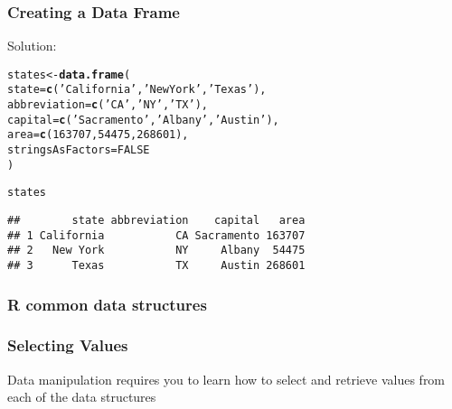 \documentclass[12pt]{beamer}\usepackage[]{graphicx}\usepackage[]{color}
\makeatletter
\newcommand{\hlnum}[1]{\textcolor[rgb]{0.686,0.059,0.569}{#1}}%
\newcommand{\hlstr}[1]{\textcolor[rgb]{0.192,0.494,0.8}{#1}}%
\newcommand{\hlstd}[1]{\textcolor[rgb]{0.345,0.345,0.345}{#1}}%
\newcommand{\hlkwb}[1]{\textcolor[rgb]{0.69,0.353,0.396}{#1}}%
\newcommand{\hlkwc}[1]{\textcolor[rgb]{0.333,0.667,0.333}{#1}}%
\newcommand{\hlkwd}[1]{\textcolor[rgb]{0.737,0.353,0.396}{\textbf{#1}}}%
\newenvironment{kframe}{%
 \def\at@end@of@kframe{}%
 \ifinner\ifhmode%
  \def\at@end@of@kframe{\end{minipage}}%
  \begin{minipage}{\columnwidth}%
 \fi\fi%
 \def\FrameCommand##1{\hskip\@totalleftmargin \hskip-\fboxsep
 \colorbox{shadecolor}{##1}\hskip-\fboxsep
     \hskip-\linewidth \hskip-\@totalleftmargin \hskip\columnwidth}%
 \MakeFramed {\advance\hsize-\width
   \@totalleftmargin\z@ \linewidth\hsize
   \@setminipage}}%
 {\par\unskip\endMakeFramed%
 \at@end@of@kframe}
\newenvironment{knitrout}{}{} %
\makeatother
\begin{document}
\begin{frame}[fragile]
\frametitle{Creating a Data Frame}

Solution:
\begin{knitrout}\footnotesize
{}\color{fgcolor}\begin{kframe}
\begin{alltt}
\hlstd{states} \hlkwb{<-} \hlkwd{data.frame}\hlstd{(}
  \hlkwc{state} \hlstd{=} \hlkwd{c}\hlstd{(}\hlstr{'California'}\hlstd{,} \hlstr{'New York'}\hlstd{,} \hlstr{'Texas'}\hlstd{),}
  \hlkwc{abbreviation} \hlstd{=} \hlkwd{c}\hlstd{(}\hlstr{'CA'}\hlstd{,} \hlstr{'NY'}\hlstd{,} \hlstr{'TX'}\hlstd{),}
  \hlkwc{capital} \hlstd{=} \hlkwd{c}\hlstd{(}\hlstr{'Sacramento'}\hlstd{,} \hlstr{'Albany'}\hlstd{,} \hlstr{'Austin'}\hlstd{),}
  \hlkwc{area} \hlstd{=} \hlkwd{c}\hlstd{(}\hlnum{163707}\hlstd{,} \hlnum{54475}\hlstd{,} \hlnum{268601}\hlstd{),}
  \hlkwc{stringsAsFactors} \hlstd{=} \hlnum{FALSE}
\hlstd{)}

\hlstd{states}
\end{alltt}
\begin{verbatim}
##        state abbreviation    capital   area
## 1 California           CA Sacramento 163707
## 2   New York           NY     Albany  54475
## 3      Texas           TX     Austin 268601
\end{verbatim}
\end{kframe}
\end{knitrout}

\end{frame}


\begin{frame}[fragile]
\frametitle{R common data structures}
\begin{center}
\end{center}
\end{frame}


\begin{frame}
\begin{center}
\Huge{}
\end{center}
\end{frame}


\begin{frame}
\frametitle{Selecting Values}
Data manipulation requires you to learn how to select and retrieve values from each of the data structures
\end{frame}
\end{document}
